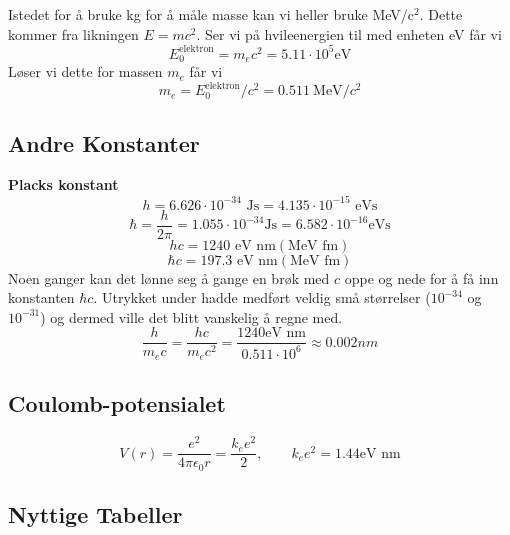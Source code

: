 Istedet for å bruke kg for å måle masse kan vi heller bruke MeV/c$^{2}$. Dette kommer fra likningen $ E = mc^{2} $. Ser vi på hvileenergien til med enheten eV får vi 
\begin{equation}
E_{0}^{\text{elektron}} = m_{e} c^{2} = 5.11 \cdot 10^{5} \text{eV}
\end{equation}
Løser vi dette for massen $ m_{e} $ får vi
\begin{equation}
m_e = E_{0}^{\text{elektron}} / c^{2} = 0.511\ \text{MeV}/c^{2}
\end{equation}

\subsection{Andre Konstanter}
\textbf{Placks konstant}
\begin{equation}
h = 6.626 ⋅  10^{-34} \text{ Js} = 4.135 ⋅ 10^{-15} \text{  eVs}
\end{equation}
\begin{equation}
ℏ = \frac{h}{2 \pi} = 1.055 ⋅ 10^{-34} \text{Js} = 6.582 ⋅ 10^{-16} \text{eVs} 
\end{equation}
\begin{equation}
hc = 1240 \text{ eV nm} (\text{MeV fm})
\end{equation}
\begin{equation}
ℏc = 197.3 \text{ eV nm} (\text{MeV fm})
\end{equation}
Noen ganger kan det lønne seg å gange en brøk med $ c $ oppe og nede for å få inn konstanten $ ℏc $. Utrykket under hadde medført veldig små størrelser ($ 10^{-34} $ og $ 10^{-31} $) og dermed ville det blitt vanskelig å regne med. 
\begin{equation}
\frac{h}{m_e c} = \frac{hc}{m_e c^{2}} = \frac{1240 \text{eV nm}}{0.511 ⋅ 10^{6}} ≈ 0.002 nm
\end{equation}
\subsection{Coulomb-potensialet}
\begin{equation}
V(r) = \frac{e^{2}}{4 \pi \epsilon_{0} r} = \frac{k_e e^{2}}{2}, \qquad k_e e^{2} = 1.44 \text{eV nm}
\end{equation}
\subsection{Nyttige Tabeller}

